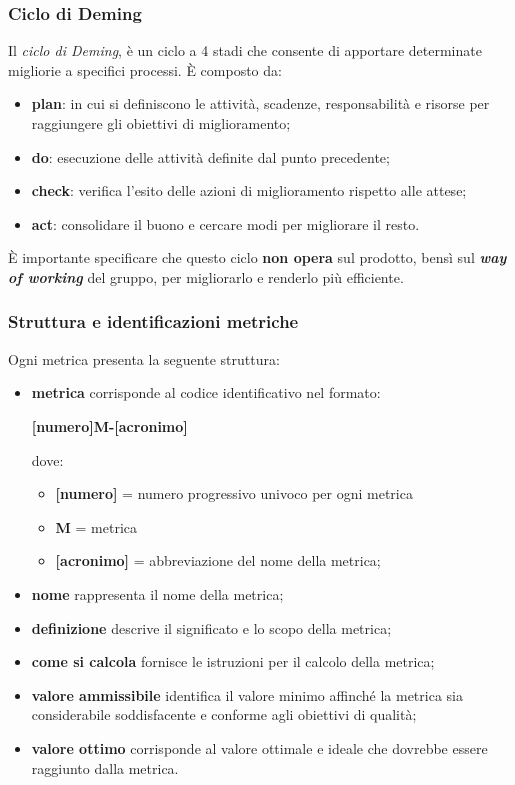 \subsubsection{Ciclo di Deming}
Il \textit{ciclo di Deming}, è un ciclo a 4 stadi che consente di apportare determinate migliorie a specifici processi. È composto da:
\begin{itemize}
	\item \textbf{plan}: in cui si definiscono le attività, scadenze, responsabilità e risorse per raggiungere gli obiettivi di miglioramento;
	\item \textbf{do}: esecuzione delle attività definite dal punto precedente;
	\item \textbf{check}: verifica l'esito delle azioni di miglioramento rispetto alle attese;
	\item \textbf{act}: consolidare il buono e cercare modi per migliorare il resto.
\end{itemize}
È importante specificare che questo ciclo \textbf{non opera} sul prodotto, bensì sul \textbf{\textit{way of working}} del gruppo, per migliorarlo e renderlo più efficiente.

\subsubsection{Struttura e identificazioni metriche}
Ogni metrica presenta la seguente struttura:
\begin{itemize}
	\item \textbf{metrica} corrisponde al codice identificativo nel formato:
	      \begin{center}
		      \textbf{[numero]M-[acronimo]}
	      \end{center}
	      dove:
	      \begin{itemize}
		      \item \textbf{[numero]} = numero progressivo univoco per ogni metrica
		      \item \textbf{M} = metrica
		      \item \textbf{[acronimo]} = abbreviazione del nome della metrica;
	      \end{itemize}
	\item \textbf{nome} rappresenta il nome della metrica;
	\item \textbf{definizione} descrive il significato e lo scopo della metrica;
	\item \textbf{come si calcola} fornisce le istruzioni per il calcolo della metrica;
	\item \textbf{valore ammissibile} identifica il valore minimo affinché la metrica sia considerabile soddisfacente e conforme agli obiettivi di qualità;
	\item \textbf{valore ottimo} corrisponde al valore ottimale e ideale che dovrebbe essere raggiunto dalla metrica.
\end{itemize}

